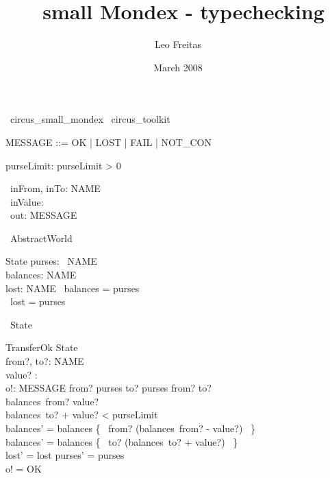 \documentclass{article}
\begin{document}
\title{\Circus\ small Mondex - typechecking}
\author{Leo Freitas}
\date{March 2008}

\maketitle

\begin{zsection}
  \SECTION\ circus\_small\_mondex \parents\ circus\_toolkit
\end{zsection}

\begin{zed}
   [NAME]
   \also
   MESSAGE ::= OK | LOST | FAIL | NOT\_CON
\end{zed}

\begin{axdef}
   purseLimit: \nat
\where
   purseLimit > 0
\end{axdef}

\begin{circus}
   \circchannel\ inFrom, inTo: NAME \\
   \circchannel\ inValue: \nat \\
   \circchannel\ out: MESSAGE
\end{circus}

\begin{circus}
   \circprocess\ AbstractWorld \circdef \circbegin
\end{circus}

\begin{schema}{State}
   purses: \power~NAME \\
   balances: NAME \pfun \nat \\
   lost: NAME \pfun \nat
\where
   \dom~balances = purses \\
   \dom~lost = purses
\end{schema}

\begin{circusaction}
   \circstate\ State
\end{circusaction}

\begin{schema}{TransferOk}
   \Delta State \\
   from?, to?: NAME \\
   value? : \nat \\
   o!: MESSAGE
\where
   from? \in purses \land  to? \in purses \land from? \neq to? \\
   balances~from? \geq value? \\
   balances~to? + value? < purseLimit \\
   balances' = balances \oplus \{~ from? \mapsto (balances~from? - value?) ~\} \\
   balances' = balances \oplus \{~ to? \mapsto (balances~to? + value?) ~\} \\
   lost' = lost \land purses' = purses \\
   o! = OK
\end{schema}
\end{document}
